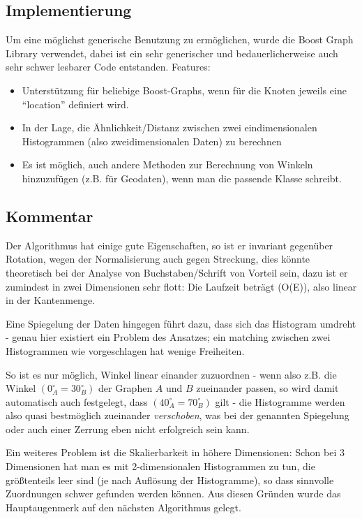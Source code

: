\documentclass{DEarticle}
\begin{document}
\subsection{Implementierung}
Um eine möglichst generische Benutzung zu ermöglichen, wurde die Boost Graph Library \cite{boostgraph} verwendet, dabei
ist ein sehr generischer und bedauerlicherweise auch sehr schwer lesbarer Code entstanden.
Features:
\begin{itemize}
\item Unterstützung für beliebige Boost-Graphs, wenn für die Knoten jeweils eine ``location'' definiert wird.
\item In der Lage, die Ähnlichkeit/Distanz zwischen zwei eindimensionalen Histogrammen (also zweidimensionalen Daten) zu
berechnen
\item Es ist möglich, auch andere Methoden zur Berechnung von Winkeln hinzuzufügen (z.B. für Geodaten), wenn man die
passende Klasse schreibt.
\end{itemize}
\subsection{Kommentar}
Der Algorithmus hat einige gute Eigenschaften, so ist er invariant gegenüber Rotation, wegen der Normalisierung auch
gegen Streckung, dies könnte theoretisch bei der Analyse von Buchstaben/Schrift von Vorteil sein, dazu ist er zumindest
in zwei Dimensionen sehr flott: Die Laufzeit beträgt (O(E)), also linear in der Kantenmenge. 

Eine Spiegelung der
Daten hingegen führt dazu, dass sich das Histogram umdreht - genau hier existiert ein Problem des Ansatzes; ein matching
zwischen zwei Histogrammen wie vorgeschlagen hat wenige Freiheiten.

So ist es nur möglich, Winkel linear einander zuzuordnen - wenn also z.B. die Winkel $(0_A^{\circ} = 30_B^{\circ})$ der
Graphen $A$ und $B$ zueinander passen, so wird damit automatisch auch festgelegt, dass $(40_A^{\circ} = 70_B^{\circ})$
gilt - die Histogramme werden also quasi bestmöglich zueinander \emph{verschoben}, was bei der genannten Spiegelung oder
auch einer Zerrung eben nicht erfolgreich sein kann.

Ein weiteres Problem ist die Skalierbarkeit in höhere Dimensionen: Schon bei 3 Dimensionen hat man es mit
2-dimensionalen Histogrammen zu tun, die größtenteils leer sind (je nach Auflösung der Histogramme), so dass sinnvolle
Zuordnungen schwer gefunden werden können.
Aus diesen Gründen wurde das Hauptaugenmerk auf den nächsten Algorithmus gelegt.
\end{document}

